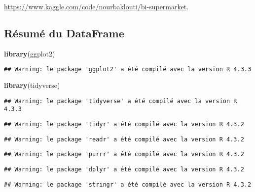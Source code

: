 \documentclass[
]{article}
\newenvironment{Shaded}{\begin{snugshade}}{\end{snugshade}}
\newcommand{\FunctionTok}[1]{\textcolor[rgb]{0.13,0.29,0.53}{\textbf{#1}}}
\newcommand{\NormalTok}[1]{#1}
\begin{document}
\url{https://www.kaggle.com/code/nourbaklouti/bi-supermarket}.

\hypertarget{ruxe9sumuxe9-du-dataframe}{%
\subsection{Résumé du DataFrame}\label{ruxe9sumuxe9-du-dataframe}}

\begin{Shaded}
\begin{Highlighting}[]
\FunctionTok{library}\NormalTok{(ggplot2)}
\end{Highlighting}
\end{Shaded}

\begin{verbatim}
## Warning: le package 'ggplot2' a été compilé avec la version R 4.3.3
\end{verbatim}

\begin{Shaded}
\begin{Highlighting}[]
\FunctionTok{library}\NormalTok{(tidyverse) }
\end{Highlighting}
\end{Shaded}

\begin{verbatim}
## Warning: le package 'tidyverse' a été compilé avec la version R 4.3.3
\end{verbatim}

\begin{verbatim}
## Warning: le package 'tidyr' a été compilé avec la version R 4.3.2
\end{verbatim}

\begin{verbatim}
## Warning: le package 'readr' a été compilé avec la version R 4.3.2
\end{verbatim}

\begin{verbatim}
## Warning: le package 'purrr' a été compilé avec la version R 4.3.2
\end{verbatim}

\begin{verbatim}
## Warning: le package 'dplyr' a été compilé avec la version R 4.3.2
\end{verbatim}

\begin{verbatim}
## Warning: le package 'stringr' a été compilé avec la version R 4.3.2
\end{verbatim}
\end{document}
